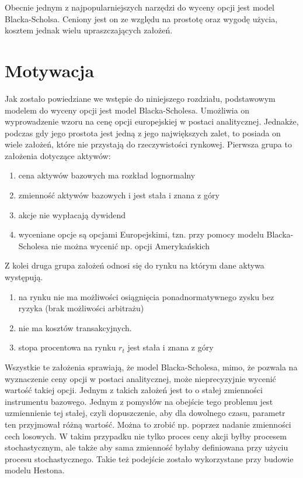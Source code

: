 \documentclass{pracamgr}
\begin{document}
Obecnie jednym z najpopularniejszych narzędzi do wyceny opcji jest model Blacka-Scholsa. Ceniony jest on ze względu na prostotę oraz wygodę użycia, kosztem jednak wielu upraszczających założeń. 


\section{Motywacja} 
Jak zostało powiedziane we wstępie do niniejszego rozdziału, podstawowym modelem do wyceny opcji jest model Blacka-Scholesa.
Umożliwia on wyprowadzenie wzoru na cenę opcji europejskiej w postaci analitycznej. Jednakże, podczas gdy jego prostota jest jedną z jego największych zalet, to posiada on wiele założeń, które nie przystają do rzeczywistości rynkowej. Pierwsza grupa to założenia dotyczące aktywów:
\begin{enumerate}
\item cena aktywów bazowych ma rozkład lognormalny
\item zmienność aktywów bazowych i jest stała i znana z góry
\item akcje nie wypłacają dywidend
\item wyceniane opcje są opcjami Europejskimi, tzn. przy pomocy modelu Blacka-Scholesa nie można wycenić np. opcji Amerykańskich
\end{enumerate}
Z kolei druga grupa założeń odnosi się do rynku na którym dane aktywa występują.
\begin{enumerate}
\item na rynku nie ma możliwości osiągnięcia ponadnormatywnego zysku bez ryzyka (brak możliwości arbitrażu)
\item nie ma kosztów transakcyjnych.
\item stopa procentowa na rynku $r_t$ jest stała i znana z góry 
\end{enumerate}

Wszystkie te założenia sprawiają, że model Blacka-Scholesa, mimo, że pozwala na wyznaczenie ceny opcji w postaci analitycznej, może nieprecyzyjnie wycenić wartość takiej opcji.
Jednym z takich założeń jest to o stałej zmienności instrumentu bazowego. Jednym z pomysłów na obejście tego problemu jest uzmiennienie tej stałej, czyli dopuszczenie, aby dla dowolnego czasu, parametr ten przyjmował różną wartość. Można to zrobić np. poprzez nadanie zmienności cech losowych. W takim przypadku nie tylko proces ceny akcji byłby procesem stochastycznym, ale także aby sama zmienność byłaby definiowana przy użyciu procesu stochastycznego. Takie też podejście zostało wykorzystane przy budowie modelu Hestona. \cite{greenwade93}
\end{document}
